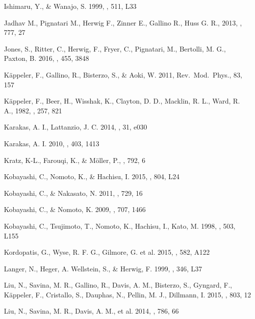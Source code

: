 \documentclass[manuscript]{aastex}
\begin{document}
\begin{thebibliography}{}
Ishimaru, Y., \& Wanajo, S. 1999, \apj, 511, L33

 Jadhav M., Pignatari M., Herwig F., Zinner E., Gallino R., Huss G. R., 2013,
\apj, 777, 27

 Jones, S., Ritter, C., Herwig, F., Fryer, C., Pignatari, M., Bertolli, M. G.,
Paxton, B. 2016, \mnras, 455, 3848

K{\"a}ppeler, F., Gallino, R., Bisterzo, S., \& Aoki, W. 2011, Rev.\ Mod.\ Phys., 83, 157

K{\"a}ppeler, F., Beer, H., Wisshak, K., Clayton, D. D., Macklin, R. L., Ward, R. A., 
1982, \apj, 257, 821

Karakas, A. I., Lattanzio, J. C. 2014, \pasa, 31, e030

Karakas, A. I. 2010, \mnras, 403, 1413

Kratz, K-L., Farouqi, K., \& M{\"o}ller, P., \apj, 792, 6

Kobayashi, C., Nomoto, K., \& Hachisu, I. 2015, \apjl, 804, L24

Kobayashi, C., \& Nakasato, N. 2011, \apj, 729, 16

Kobayashi, C., \& Nomoto, K. 2009, \apj, 707, 1466

Kobayashi, C., Tsujimoto, T., Nomoto, K., Hachisu, I., Kato, M. 1998,
\apj, 503, L155

Kordopatis, G., Wyse, R. F. G., Gilmore, G. et al. 2015, \aap, 582, A122

 Langer, N., 
Heger, A. Wellstein, S., \& Herwig, F. 1999, \aap, 346, L37

Liu, N., Savina, M. R., Gallino, R., Davis, A. M., Bisterzo, S., Gyngard, F.,
K{\"a}ppeler, F., Cristallo, S., Dauphas, N., Pellin, M. J., Dillmann, I. 2015,
\apj, 803, 12

Liu, N., Savina, M. R., Davis, A. M., et al. 2014, \apj, 786, 66


\end{thebibliography}
\end{document}
